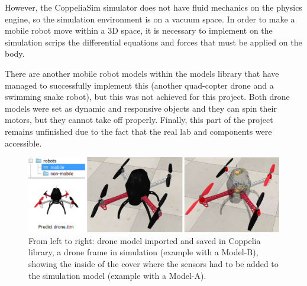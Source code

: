 However, the CoppeliaSim simulator does not have fluid mechanics on the physics engine, so the simulation environment is on a vacuum space. In order to make a mobile robot move within a 3D space, it is necessary to implement on the simulation scrips the differential equations and forces that must be applied on the body. 

There are another mobile robot models within the models library that have managed to successfully implement this (another quad-copter drone and a swimming snake robot), but this was not achieved for this project. Both drone models were set as dynamic and responsive objects and they can spin their motors, but they cannot take off properly. Finally, this part of the project remains unfinished due to the fact that the real lab and components were accessible.

\begin{figure} [H]
    \centering
    \includegraphics[width=\textwidth]{Figures/simulation/coppelia_model.png}
    \caption{From left to right: drone model imported and saved in Coppelia library, a drone frame in simulation (example with a Model-B), showing the inside of the cover where the sensors had to be added to the simulation model (example with a Model-A).}
    \label{fig:sim_models}
\end{figure}
